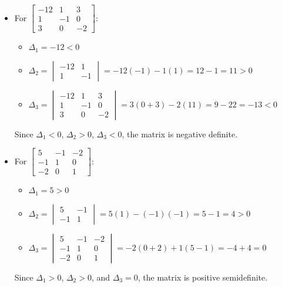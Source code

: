 \documentclass{article}
\begin{document}
\begin{itemize}
\item For $\begin{bmatrix} -12 & 1 & 3 \\ 1 & -1 & 0 \\ 3 & 0 & -2 \end{bmatrix}$:
\begin{itemize}
\item $\Delta_1 = -12 < 0$
\item $\Delta_2 = \begin{vmatrix} -12 & 1 \\ 1 & -1 \end{vmatrix} = -12(-1) - 1(1) = 12 - 1 = 11 > 0$
\item $\Delta_3 = \begin{vmatrix} -12 & 1 & 3 \\ 1 & -1 & 0 \\ 3 & 0 & -2 \end{vmatrix} = 3(0 + 3) - 2(11) = 9 - 22 = -13 < 0$
\end{itemize}
Since $\Delta_1 < 0$, $\Delta_2 > 0$, $\Delta_3 < 0$, the matrix is negative definite.
\end{itemize}

\begin{itemize}
\item For $\begin{bmatrix} 5 & -1 & -2 \\ -1 & 1 & 0 \\ -2 & 0 & 1 \end{bmatrix}$:
\begin{itemize}
\item $\Delta_1 = 5 > 0$
\item $\Delta_2 = \begin{vmatrix} 5 & -1 \\ -1 & 1 \end{vmatrix} = 5(1) - (-1)(-1) = 5 - 1 = 4 > 0$
\item $\Delta_3 = \begin{vmatrix} 5 & -1 & -2 \\ -1 & 1 & 0 \\ -2 & 0 & 1 \end{vmatrix} = -2(0 + 2) + 1(5 - 1) = -4 + 4 = 0$
\end{itemize}
Since $\Delta_1 > 0$, $\Delta_2 > 0$, and $\Delta_3 = 0$, the matrix is positive semidefinite.
\end{itemize}

\newpage
\end{document}
